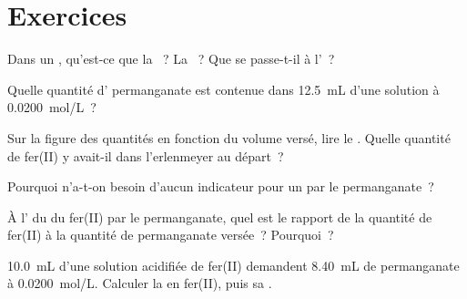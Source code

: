 \section{Exercices}


\begin{exercise}[$\star$]\label{exo:g11:titration:1}
Dans un , qu'est-ce que la ~? La ~? Que se passe-t-il à l'~?
\end{exercise}

\begin{exercise}[$\star$]\label{exo:g11:titration:2}
Quelle quantité d' permanganate est contenue dans \qty{12.5}{mL}
d'une solution à \qty{0.0200}{mol/L}~?
\end{exercise}

\begin{exercise}[$\star$]\label{exo:g11:titration:3}
Sur la figure des quantités en fonction du volume versé, lire le . Quelle quantité de fer(II) y avait-il dans
l'erlenmeyer au départ~?
\end{exercise}

\begin{exercise}[$\star$]\label{exo:g11:titration:4}
Pourquoi n'a-t-on besoin d'aucun indicateur pour un  par le
permanganate~?
\end{exercise}

\begin{exercise}[$\star$]\label{exo:g11:titration:5}
À l' du  du fer(II) par le permanganate, quel est le
rapport de la quantité de fer(II) à la quantité de permanganate versée~?
Pourquoi~?
\end{exercise}

\begin{exercise}[$\star\star$]\label{exo:g11:titration:6}
\qty{10.0}{mL} d'une solution acidifiée de fer(II) demandent
\qty{8.40}{mL} de permanganate à \qty{0.0200}{mol/L}. Calculer la
 en fer(II), puis sa .
\end{exercise}


